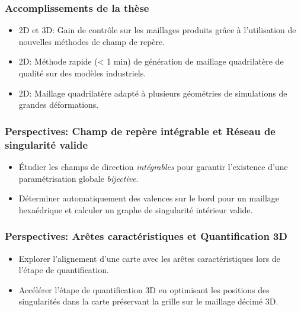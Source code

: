 \begin{frame}
    \frametitle{Accomplissements de la thèse}
    \begin{itemize}
    \item 2D et 3D: Gain de contrôle sur les maillages produits grâce à l'utilisation de nouvelles méthodes de champ de repère.
    \item 2D: Méthode rapide (< 1 min) de génération de maillage quadrilatère de qualité sur des modèles industriels.
    \item 2D: Maillage quadrilatère adapté à plusieurs géométries de simulations de grandes déformations.
    \end{itemize}
\end{frame}
    
\begin{frame}
    \frametitle{Perspectives: Champ de repère intégrable et Réseau de singularité valide}
    \begin{itemize}
    \item Étudier les champs de direction \textit{intégrables} pour garantir l'existence d'une paramétrisation globale \textit{bijective}.
    \item Déterminer automatiquement des valences sur le bord pour un maillage hexaédrique et calculer un graphe de singularité intérieur valide.
    \end{itemize}
\end{frame}
    
\begin{frame}
    \frametitle{Perspectives: Arêtes caractéristiques et Quantification 3D}
    \begin{itemize}
    \item Explorer l'alignement d'une carte avec les arêtes caractéristiques lors de l'étape de quantification.
    \item Accélérer l'étape de quantification 3D en optimisant les positions des singularités dans la carte préservant la grille sur le maillage décimé 3D.
    \end{itemize}
\end{frame}
    